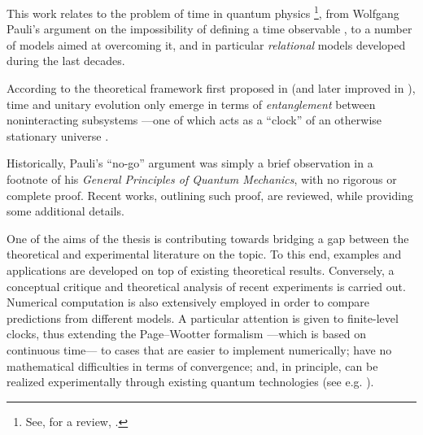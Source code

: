 This work relates to the problem of time in quantum physics%
\footnote{
  See, for a review, \cite{TQM1, TQM2}.
},
from Wolfgang Pauli's argument
on the impossibility of defining a time observable \parencite{PauliFootnote},
to a number of models aimed at overcoming it,
and in particular \emph{relational} models
developed during the last decades.

According to the theoretical framework first proposed in \cite{PageWootters}
(and later improved in \cite{Lloyd:Time}),
time and unitary evolution only emerge in
terms of \emph{entanglement} between noninteracting subsystems
---one of which acts as a ``clock''
of an otherwise stationary universe \parencite{Marletto:Evolution}.

Historically, Pauli's ``no-go'' argument was simply a brief observation in a footnote
of his \textit{General Principles of Quantum Mechanics},
with no rigorous or complete proof. Recent works, outlining such proof, are
reviewed, while providing some additional details.

One of the aims of the thesis
is contributing towards bridging a gap between the theoretical
and experimental literature on the topic.
To this end, examples and applications are developed on top of existing theoretical results.  
Conversely,
a conceptual critique and theoretical analysis
of recent experiments is carried out.
Numerical computation is also extensively employed in order to compare
predictions from different models. A particular attention is given
to finite-level clocks,
thus extending the Page--Wootter formalism ---which is based on continuous time---
to cases that are easier to implement numerically;
have no mathematical difficulties in terms of convergence;
and, in principle, can be realized experimentally through existing quantum technologies
(see e.g. \cite{FiniteHilb}). 